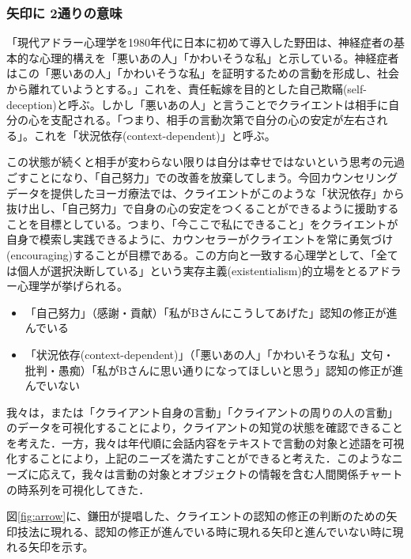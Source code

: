 \documentclass[shuuron]{kuee}
\begin{document}
\subsubsection{矢印に
2通りの意味
}


「現代アドラー心理学を1980年代に日本に初めて導入した野田\cite{zokad}は、神経症者の基本的な心理的構えを「悪いあの人」「かわいそうな私」と示している。神経症者はこの「悪いあの人」「かわいそうな私」を証明するための言動を形成し、社会から離れていようとする。」これを、責任転嫁を目的とした自己欺瞞(self-deception)と呼ぶ\cite{Darshana}。しかし「悪いあの人」と言うことでクライエントは相手に自分の心を支配される。「つまり、相手の言動次第で自分の心の安定が左右される」。これを「状況依存(context-dependent)」と呼ぶ。

この状態が続くと相手が変わらない限りは自分は幸せではないという思考の元過ごすことになり、「自己努力」での改善を放棄してしまう。今回カウンセリングデータを提供したヨーガ療法では、クライエントがこのような「状況依存」から抜け出し、「自己努力」で自身の心の安定をつくることができるように援助することを目標としている。つまり、「今ここで私にできること」をクライエントが自身で模索し実践できるように、カウンセラーがクライエントを常に勇気づけ(encouraging)することが目標である。この方向と一致する心理学として、「全ては個人が選択決断している」という実存主義(existentialism)的立場をとるアドラー心理学が挙げられる。

\begin{itemize}
  \item 「自己努力」（感謝・貢献）「私がBさんにこうしてあげた」認知の修正が進んでいる
  \item 「状況依存(context-dependent)」（「悪いあの人」「かわいそうな私」文句・批判・愚痴）「私がBさんに思い通りになってほしいと思う」認知の修正が進んでいない
\end{itemize}

我々は，または「クライアント自身の言動」「クライアントの周りの人の言動」のデータを可視化することにより，クライアントの知覚の状態を確認できることを考えた．一方，我々は年代順に会話内容をテキストで言動の対象と述語を可視化することにより，上記のニーズを満たすことができると考えた．このようなニーズに応えて，我々は言動の対象とオブジェクトの情報を含む人間関係チャートの時系列を可視化してきた．

図\ref{fig:arrow}に、鎌田\cite{鎌田穣2002臨床}が提唱した、クライエントの認知の修正の判断のための矢印技法に現れる、認知の修正が進んでいる時に現れる矢印と進んでいない時に現れる矢印を示す。
\end{document}
